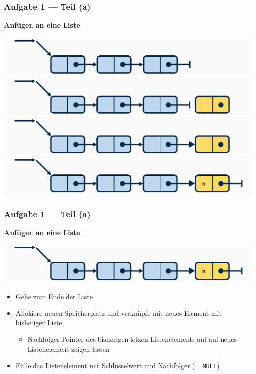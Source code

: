 \documentclass{beamer}
\begin{document}
\begin{frame} \frametitle{Aufgabe 1 --- Teil (a)}
	\textbf{Anfügen an eine Liste}
	
	\includegraphics[width=\linewidth]{tut06-graphics/tut06-append1} \\ \pause
	\includegraphics[width=\linewidth]{tut06-graphics/tut06-append2} \\ \pause
	\includegraphics[width=\linewidth]{tut06-graphics/tut06-append3} \\ \pause
	\includegraphics[width=\linewidth]{tut06-graphics/tut06-append4}
\end{frame}

\begin{frame}[fragile] \frametitle{Aufgabe 1 --- Teil (a)}
	\textbf{Anfügen an eine Liste}
	
	\begin{center}
		\includegraphics[width=\linewidth]{tut06-graphics/tut06-append4}
	\end{center}

	\pause
	
	\begin{itemize}
		\item Gehe zum Ende der Liste
		\item Allokiere neuen Speicherplatz und verknüpfe mit neues Element mit bisheriger Liste
		\begin{itemize}
			\item Nachfolger-Pointer des bisherigen letzen Listenelements auf auf neues Listenelement zeigen lassen
		\end{itemize}
		\item Fülle das Listenelement mit Schlüsselwert und Nachfolger (= \texttt{NULL})
	\end{itemize}
\end{frame}
\end{document}
